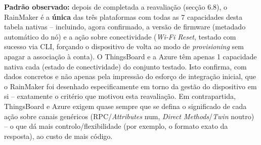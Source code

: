 \documentclass[a4paper,12pt]{article}
\begin{document}
\begin{center}
\end{center}

\textbf{Padrão observado:} depois de completada a reavaliação (secção 6.8), o RainMaker é a \textbf{única} das três plataformas com todas as 7 capacidades desta tabela nativas -- incluindo, agora confirmado, a versão de firmware (metadado automático do nó) e a ação sobre conectividade (\textit{Wi-Fi Reset}, testado com sucesso via CLI, forçando o dispositivo de volta ao modo de \textit{provisioning} sem apagar a associação à conta). O ThingsBoard e a Azure têm apenas 1 capacidade nativa cada (estado de conectividade) do conjunto testado. Isto confirma, com dados concretos e não apenas pela impressão do esforço de integração inicial, que o RainMaker foi desenhado especificamente em torno da gestão do dispositivo em si -- exatamente o critério que motivou esta reavaliação. Em contrapartida, ThingsBoard e Azure exigem quase sempre que se defina o significado de cada ação sobre canais genéricos (RPC/\textit{Attributes} num, \textit{Direct Methods}/\textit{Twin} noutro) -- o que dá mais controlo/flexibilidade (por exemplo, o formato exato da resposta), ao custo de mais código.
\end{document}
